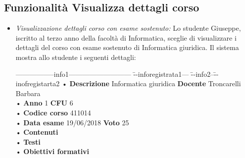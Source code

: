 \subsection{Funzionalità Visualizza dettagli corso}
\begin{itemize}
	\item \textit{Visualizzazione dettagli corso con esame sostenuto:}
	Lo studente Giuseppe, iscritto al terzo anno della facoltà di Informatica, sceglie di visualizzare i dettagli del corso con esame sostenuto di Informatica giuridica. Il sistema mostra allo studente i seguenti dettagli:
	\begin{tabbing}
		\hspace{1cm}-----------------info1--------------------------- \= --inforegistrata1--- \= --info2--\=--inofregistarta2 \kill
		\hspace{1cm} • \textbf{Descrizione} Informatica giuridica \> \textbf{Docente} Troncarelli Barbara\\
		\hspace{1cm} • \textbf{Anno} 1 \> \textbf{CFU} 6   \\
		\hspace{1cm} • \textbf{Codice corso} 411014 \\
		\hspace{1cm} • \textbf{Data esame} 19/06/2018 \> \textbf{Voto} 25 \\
		\hspace{1cm} • \textbf{Contenuti} \\
		\hspace{1cm} • \textbf{Testi} \\
		\hspace{1cm} • \textbf{Obiettivi formativi} \\
	\end{tabbing}


\end{itemize}
